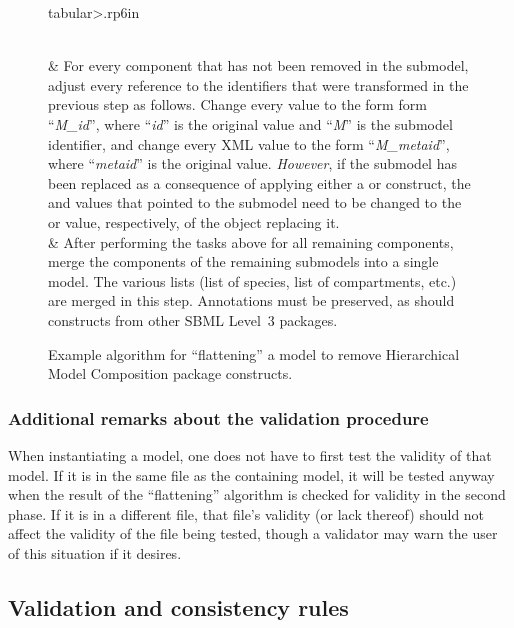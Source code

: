\begin{figure}[thb]
\begin{edtable}{tabular}{>{\therownum.}rp{6in}}
\begin{enumerate}[label={\alph*})]
    \vspace*{-1em}
    \end{enumerate}
    \\
    & For every component that has not been removed in the submodel,
    adjust every reference to the identifiers that were transformed in
    the previous step as follows.  Change every  value
    to the form form ``\emph{M\_id}'', where ``\emph{id}'' is the
    original  value and ``\emph{M}'' is the submodel
    identifier, and change every XML  value to the form
    ``\emph{M\_metaid}'', where ``\emph{metaid}'' is the original
     value.  \emph{However}, if the submodel has been
    replaced as a consequence of applying either a \ReplacedElement or
    \ReplacedBy construct, the  and 
    values that pointed to the submodel need to be changed to the
     or  value, respectively, of the object
    replacing it.
    \\
    & After performing the tasks above for all remaining components,
    merge the components of the remaining submodels into a single model.
    The various lists (list of species, list of compartments, etc.) are
    merged in this step.  Annotations must be preserved, as should
    constructs from other SBML Level~3 packages.
    \\
    \bottomrule
  \end{edtable}
  \caption{Example algorithm for ``flattening'' a model to remove
    Hierarchical Model Composition package constructs.}
  \label{flattening-algo}
\end{figure}


\subsubsection{Additional remarks about the validation procedure}

When instantiating a model, one does not have to first test the validity
of that model.  If it is in the same file as the containing model, it
will be tested anyway when the result of the ``flattening'' algorithm is
checked for validity in the second phase.  If it is in a different file,
that file's validity (or lack thereof) should not affect the validity of
the file being tested, though a validator may warn the user of this
situation if it desires.


\subsection{Validation and consistency rules}
\label{validation-rules}

